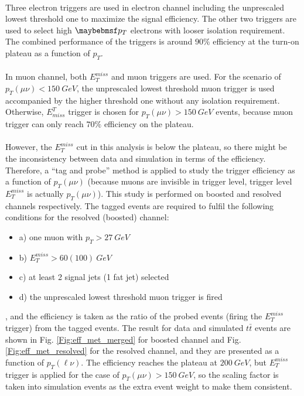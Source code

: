 \noindent
\\Three electron triggers are used in electron channel including the unprescaled lowest threshold one to maximize the signal efficiency. The other two triggers are used to select high $\p_{T}$ electrons with looser isolation requirement. The combined performance of the triggers is around $90\%$ efficiency at the turn-on plateau as a function of $p_{T}$.
\\
\\In muon channel, both $E_{T}^{miss}$ and muon triggers are used. For the scenario of $p_{T}(\mu\nu)<150~GeV$, the unprescaled lowest threshold muon trigger is used accompanied by the higher threshold one without any isolation requirement. Otherwise, $E^{T}_{miss}$ trigger is chosen for $p_{T}(\mu\nu)>150~GeV$ events, because muon trigger can only reach $70\%$ efficiency on the plateau.
\\
\\However, the $E^{miss}_{T}$ cut in this analysis is below the plateau, so there might be the inconsistency between data and simulation in terms of the efficiency. Therefore, a ``tag and probe'' method is applied to study the trigger efficiency as a function of $p_{T}(\mu\nu)$ (because muons are invisible in trigger level, trigger level $E_{T}^{miss}$ is actually $p_{T}(\mu\nu)$). This study is performed on boosted and resolved channels respectively. The tagged events are required to fulfil the following conditions for the resolved (boosted) channel: 
\begin{itemize}
	\item[] a) one muon with $p_{T}>27~GeV$
	\item[] b) $E^{miss}_{T}>60(100)~GeV$
	\item[] c) at least 2 signal jets (1 fat jet) selected
	\item[] d) the unprescaled lowest threshold muon trigger is fired
\end{itemize}
, and the efficiency is taken as the ratio of the probed events (firing the $E^{miss}_{T}$ trigger) from the tagged events. The result for data and simulated $t\bar{t}$ events are shown in Fig. \ref{Fig:eff_met_merged} for boosted channel and Fig. \ref{Fig:eff_met_resolved} for the resolved channel, and they are presented as a function of $p_{T}(\ell\nu)$. The efficiency reaches the plateau at $200~GeV$, but $E^{miss}_{T}$ trigger is applied for the case of $p_{T}(\mu\nu)>150~GeV$, so the scaling factor is taken into simulation events as the extra event weight to make them consistent. 
